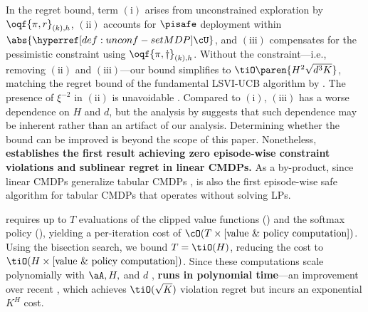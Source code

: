 \begin{remark}\label{remark:regret}  
In the regret bound, term \((\mathrm{i})\) arises from unconstrained exploration by \(\oqf{\pi, r}_{(k), h}\),
\((\mathrm{ii})\) accounts for \(\pisafe\) deployment within \(\abs{\unconfMDP}\), 
and \((\mathrm{iii})\) compensates for the pessimistic constraint using \(\oqf{\pi, \dagger}_{(k), h}\). 
Without the constraint---i.e., removing \((\mathrm{ii})\) and \((\mathrm{iii})\)---our bound simplifies to \(\tiO\paren{H^{2} \sqrt{d^3 K}}\), matching the regret bound of the fundamental LSVI-UCB algorithm by \citet{jin2020provably}.
The presence of $\xi^{-2}$ in $(\mathrm{ii})$ is unavoidable \citep{pacchiano2021stochastic}.
Compared to $(\mathrm{i})$, $(\mathrm{iii})$ has a worse dependence on $H$ and $d$, but the analysis by \citet{vaswani2022near} suggests that such dependence may be inherent rather than an artifact of our analysis.
Determining whether the bound can be improved is beyond the scope of this paper.
Nonetheless, \textbf{\MDPalgo establishes the first result achieving zero episode-wise constraint violations and sublinear regret in linear CMDPs.}
As a by-product, since linear CMDPs generalize tabular CMDPs \citep{jin2020provably}, \MDPalgo is also the first episode-wise safe algorithm for tabular CMDPs that operates without solving LPs.
\end{remark}

\begin{remark}\label{remark:computational cost}  
 requires up to \( T \) evaluations of the clipped value functions () and the softmax policy (), yielding a per-iteration cost of \( \cO(T \times \text{[value \& policy computation]})\).  
Using the bisection search, we bound \( T = \tiO(H) \), reducing the cost to \( \tiO(H \times \text{[value \& policy computation]}) \).  
Since these computations scale polynomially with \( \aA, H, \) and \( d \) \citep{lykouris2021corruption}, \textbf{\MDPalgo runs in polynomial time}---an improvement over recent \citet{ghosh2024towards}, which achieves $\tiO(\sqrt{K})$ violation regret but incurs an exponential \( K^H \) cost.
\end{remark}
